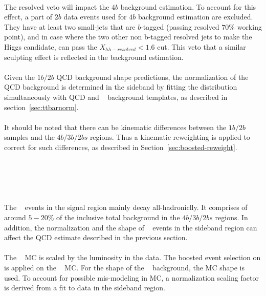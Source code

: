 \paragraph{} 
The resolved veto will impact the $4b$ background estimation. 
To account for this effect, a part of $2b$ data events used for $4b$ background estimation are excluded. 
They have at least two small-\R jets that are $b$-tagged (passing resolved $70\%$ working point), and in case where the two other non b-tagged resolved jets to make the Higgs candidate, can pass the $X_{hh-resolved} < 1.6$ cut. 
This veto that a similar sculpting effect is reflected in the background estimation.

\paragraph{}
Given the $1b/2b$ QCD background shape predictions, the normalization of the QCD background is determined in the sideband by fitting the \mleadJ distribution simultaneously with QCD and \ttbar~ background templates, as described in section~\ref{sec:ttbarnorm}.

\paragraph{}
It should be noted that there can be kinematic differences between the $1b/2b$ samples and the $4b/3b/2bs$ regions.  Thus a kinematic reweighting is applied to correct for such differences, as described in Section~\ref{sec:boosted-reweight}.



\section{\ttbar~}
\label{sec:boosted-ttbar}

\paragraph{}
The \ttbar~ events in the signal region mainly decay all-hadroniclly.
It comprises of around $5-20$\%  of the inclusive total background in the $4b/3b/2bs$ regions. 
In addition, the normalization and the shape of \ttbar~ events in the sideband region can affect the QCD estimate described in the previous section.

\paragraph{}
The \ttbar~ MC is scaled by the luminosity in the data.
The boosted event selection on is applied on the \ttbar~ MC.
For the shape of the \ttbar~ background, the MC shape is used.   
To account for possible mis-modeling in MC, a normalization scaling factor is derived from a fit to data in the sideband region.


